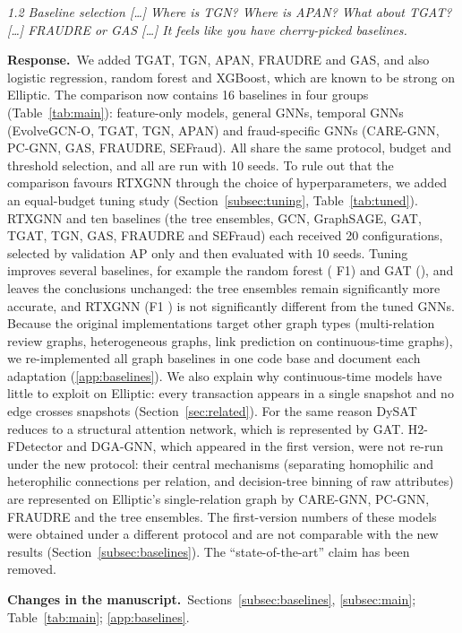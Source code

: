 \documentclass[11pt]{article}
\newenvironment{comment}{\par\medskip\noindent\begin{minipage}{\linewidth}\itshape\color{black!75}}{\end{minipage}\par\smallskip}
\newcommand{\resp}{\par\noindent\textbf{Response.}\ }
\newcommand{\change}{\par\noindent\textbf{Changes in the manuscript.}\ }
\begin{document}
\begin{comment}
1.2 Baseline selection [\dots] Where is TGN? Where is APAN? What about TGAT? [\dots] FRAUDRE or GAS [\dots] It feels like you have cherry-picked baselines.
\end{comment}
\resp We added TGAT, TGN, APAN, FRAUDRE and GAS, and also logistic regression, random forest and XGBoost, which are known to be strong on Elliptic. The comparison now contains 16 baselines in four groups (Table~\ref{tab:main}): feature-only models, general GNNs, temporal GNNs (EvolveGCN-O, TGAT, TGN, APAN) and fraud-specific GNNs (CARE-GNN, PC-GNN, GAS, FRAUDRE, SEFraud). All share the same protocol, budget and threshold selection, and all are run with 10 seeds. To rule out that the comparison favours RTXGNN through the choice of hyperparameters, we added an equal-budget tuning study (Section~\ref{subsec:tuning}, Table~\ref{tab:tuned}). RTXGNN and ten baselines (the tree ensembles, GCN, GraphSAGE, GAT, TGAT, TGN, GAS, FRAUDRE and SEFraud) each received 20 configurations, selected by validation AP only and then evaluated with 10 seeds. Tuning improves several baselines, for example the random forest (\tungainrf{} F1) and GAT (\tungaingat), and leaves the conclusions unchanged: the tree ensembles remain significantly more accurate, and RTXGNN (F1 \tunrtxgnnFone) is not significantly different from the tuned GNNs. Because the original implementations target other graph types (multi-relation review graphs, heterogeneous graphs, link prediction on continuous-time graphs), we re-implemented all graph baselines in one code base and document each adaptation (\ref{app:baselines}). We also explain why continuous-time models have little to exploit on Elliptic: every transaction appears in a single snapshot and no edge crosses snapshots (Section~\ref{sec:related}). For the same reason DySAT reduces to a structural attention network, which is represented by GAT. H2-FDetector and DGA-GNN, which appeared in the first version, were not re-run under the new protocol: their central mechanisms (separating homophilic and heterophilic connections per relation, and decision-tree binning of raw attributes) are represented on Elliptic's single-relation graph by CARE-GNN, PC-GNN, FRAUDRE and the tree ensembles. The first-version numbers of these models were obtained under a different protocol and are not comparable with the new results (Section~\ref{subsec:baselines}). The ``state-of-the-art'' claim has been removed.
\change Sections~\ref{subsec:baselines}, \ref{subsec:main}; Table~\ref{tab:main}; \ref{app:baselines}.
\end{document}
